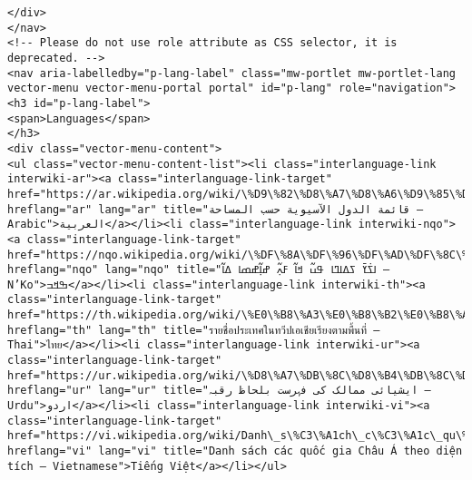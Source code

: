 \documentclass[11pt]{article}
\begin{document}
\begin{Verbatim}[commandchars=\\\{\}]
</div>
</nav>
<!-- Please do not use role attribute as CSS selector, it is deprecated. -->
<nav aria-labelledby="p-lang-label" class="mw-portlet mw-portlet-lang vector-menu vector-menu-portal portal" id="p-lang" role="navigation">
<h3 id="p-lang-label">
<span>Languages</span>
</h3>
<div class="vector-menu-content">
<ul class="vector-menu-content-list"><li class="interlanguage-link interwiki-ar"><a class="interlanguage-link-target" href="https://ar.wikipedia.org/wiki/\%D9\%82\%D8\%A7\%D8\%A6\%D9\%85\%D8\%A9\_\%D8\%A7\%D9\%84\%D8\%AF\%D9\%88\%D9\%84\_\%D8\%A7\%D9\%84\%D8\%A2\%D8\%B3\%D9\%8A\%D9\%88\%D9\%8A\%D8\%A9\_\%D8\%AD\%D8\%B3\%D8\%A8\_\%D8\%A7\%D9\%84\%D9\%85\%D8\%B3\%D8\%A7\%D8\%AD\%D8\%A9" hreflang="ar" lang="ar" title="قائمة الدول الآسيوية حسب المساحة – Arabic">العربية</a></li><li class="interlanguage-link interwiki-nqo"><a class="interlanguage-link-target" href="https://nqo.wikipedia.org/wiki/\%DF\%8A\%DF\%96\%DF\%AD\%DF\%8C\%DF\%AB\_\%DF\%96\%DF\%A1\%DF\%8A\%DF\%A3\%DF\%8A\_\%DF\%9F\%DF\%8E\%DF\%AC\_\%DF\%9E\%DF\%8A\%DF\%AC\_\%DF\%93\%DF\%8D\%DF\%B2\%DF\%AC\_\%DF\%9D\%DF\%8A\%DF\%B2\%DF\%AC\%DF\%9D\%DF\%98\%DF\%8A\_\%DF\%A1\%DF\%8A\%DF\%AC" hreflang="nqo" lang="nqo" title="ߊߖ߭ߌ߫ ߖߡߊߣߊ ߟߎ߬ ߞߊ߬ ߓߍ߲߬ ߝߊ߲߬ߝߘߊ ߡߊ߬ – N’Ko">ߒߞߏ</a></li><li class="interlanguage-link interwiki-th"><a class="interlanguage-link-target" href="https://th.wikipedia.org/wiki/\%E0\%B8\%A3\%E0\%B8\%B2\%E0\%B8\%A2\%E0\%B8\%8A\%E0\%B8\%B7\%E0\%B9\%88\%E0\%B8\%AD\%E0\%B8\%9B\%E0\%B8\%A3\%E0\%B8\%B0\%E0\%B9\%80\%E0\%B8\%97\%E0\%B8\%A8\%E0\%B9\%83\%E0\%B8\%99\%E0\%B8\%97\%E0\%B8\%A7\%E0\%B8\%B5\%E0\%B8\%9B\%E0\%B9\%80\%E0\%B8\%AD\%E0\%B9\%80\%E0\%B8\%8A\%E0\%B8\%B5\%E0\%B8\%A2\%E0\%B9\%80\%E0\%B8\%A3\%E0\%B8\%B5\%E0\%B8\%A2\%E0\%B8\%87\%E0\%B8\%95\%E0\%B8\%B2\%E0\%B8\%A1\%E0\%B8\%9E\%E0\%B8\%B7\%E0\%B9\%89\%E0\%B8\%99\%E0\%B8\%97\%E0\%B8\%B5\%E0\%B9\%88" hreflang="th" lang="th" title="รายชื่อประเทศในทวีปเอเชียเรียงตามพื้นที่ – Thai">ไทย</a></li><li class="interlanguage-link interwiki-ur"><a class="interlanguage-link-target" href="https://ur.wikipedia.org/wiki/\%D8\%A7\%DB\%8C\%D8\%B4\%DB\%8C\%D8\%A7\%D8\%A6\%DB\%8C\_\%D9\%85\%D9\%85\%D8\%A7\%D9\%84\%DA\%A9\_\%DA\%A9\%DB\%8C\_\%D9\%81\%DB\%81\%D8\%B1\%D8\%B3\%D8\%AA\_\%D8\%A8\%D9\%84\%D8\%AD\%D8\%A7\%D8\%B8\_\%D8\%B1\%D9\%82\%D8\%A8\%DB\%81" hreflang="ur" lang="ur" title="ایشیائی ممالک کی فہرست بلحاظ رقبہ – Urdu">اردو</a></li><li class="interlanguage-link interwiki-vi"><a class="interlanguage-link-target" href="https://vi.wikipedia.org/wiki/Danh\_s\%C3\%A1ch\_c\%C3\%A1c\_qu\%E1\%BB\%91c\_gia\_Ch\%C3\%A2u\_\%C3\%81\_theo\_di\%E1\%BB\%87n\_t\%C3\%ADch" hreflang="vi" lang="vi" title="Danh sách các quốc gia Châu Á theo diện tích – Vietnamese">Tiếng Việt</a></li></ul>

\end{Verbatim}
\end{document}
